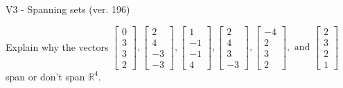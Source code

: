 \begin{exercise}
  \begin{exerciseTitle}V3 - Spanning sets (ver. 196)\end{exerciseTitle}
  \begin{exerciseStatement}
    Explain why the vectors \(\left[\begin{array}{r}
0 \\
3 \\
3 \\
2
\end{array}\right] , \left[\begin{array}{r}
2 \\
4 \\
-3 \\
-3
\end{array}\right] , \left[\begin{array}{r}
1 \\
-1 \\
-1 \\
4
\end{array}\right] , \left[\begin{array}{r}
2 \\
4 \\
3 \\
-3
\end{array}\right] , \left[\begin{array}{r}
-4 \\
2 \\
3 \\
2
\end{array}\right] , \text{ and } \left[\begin{array}{r}
2 \\
3 \\
2 \\
1
\end{array}\right]\) span or don't span \(\mathbb{R}^4\). 
	



\end{exerciseStatement}
\end{exercise}
